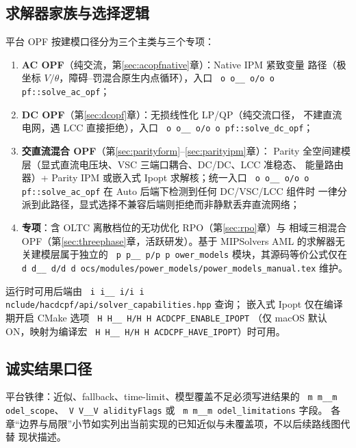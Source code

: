 \documentclass[UTF8,fontset=fandol,a4paper,11pt]{ctexart}
\makeatletter
\newcommand{\fld}[1]{\texttt{\fld@scan#1\fld@stop}}
\def\fld@scan#1{%
  \ifx#1\fld@stop
  \else
    \ifx#1\_\_\allowbreak\else#1\fi
    \expandafter\fld@scan
  \fi}
\newcommand{\srcpath}[1]{\texttt{\src@scan#1\src@stop}}
\def\src@scan#1{%
  \ifx#1\src@stop
  \else
    \ifx#1\_\_\allowbreak\else
    \ifx#1/#1\allowbreak\else
    #1\fi\fi
    \expandafter\src@scan
  \fi}
\makeatother
\begin{document}
\subsection{求解器家族与选择逻辑}
平台 OPF 按建模口径分为三个主类与三个专项：
\begin{enumerate}
  \item \textbf{AC OPF}（纯交流，第\ref{sec:acopfnative}章）：Native IPM 紧致变量
        路径（极坐标 $V/\theta$，障碍--罚混合原生内点循环），入口
        \srcpath{opf::solve\_ac\_opf}；
  \item \textbf{DC OPF}（第\ref{sec:dcopf}章）：无损线性化 LP/QP（纯交流口径，
        不建直流电网，遇 LCC 直接拒绝），入口 \srcpath{opf::solve\_dc\_opf}；
  \item \textbf{交直流混合 OPF}（第\ref{sec:parityform}--\ref{sec:parityipm}章）：
        Parity 全空间建模层（显式直流电压块、VSC 三端口耦合、DC/DC、LCC 准稳态、
        能量路由器）+ Parity IPM 或嵌入式 Ipopt 求解核；统一入口
        \srcpath{opf::solve\_ac\_opf} 在 Auto 后端下检测到任何 DC/VSC/LCC 组件时
        一律分派到此路径，显式选择不兼容后端则拒绝而非静默丢弃直流网络；
  \item \textbf{专项}：含 OLTC 离散档位的无功优化 RPO（第\ref{sec:rpo}章）与
        相域三相混合 OPF（第\ref{sec:threephase}章，活跃研发）。基于
        MIPSolvers AML 的求解器无关建模层属于独立的 \srcpath{power\_models}
        模块，其源码等价公式仅在
        \srcpath{docs/modules/power\_models/power\_models\_manual.tex} 维护。
\end{enumerate}
运行时可用后端由 \srcpath{include/hacdcpf/api/solver\_capabilities.hpp} 查询；
嵌入式 Ipopt 仅在编译期开启 CMake 选项 \srcpath{HACDCPF\_ENABLE\_IPOPT}
（仅 macOS 默认 ON，映射为编译宏 \srcpath{HACDCPF\_HAVE\_IPOPT}）时可用。

\subsection{诚实结果口径}
平台铁律：近似、fallback、time-limit、模型覆盖不足必须写进结果的
\fld{model\_scope}、\fld{ValidityFlags} 或 \fld{model\_\allowbreak limitations} 字段。
各章“边界与局限”小节如实列出当前实现的已知近似与未覆盖项，不以后续路线图代替
现状描述。
\end{document}
